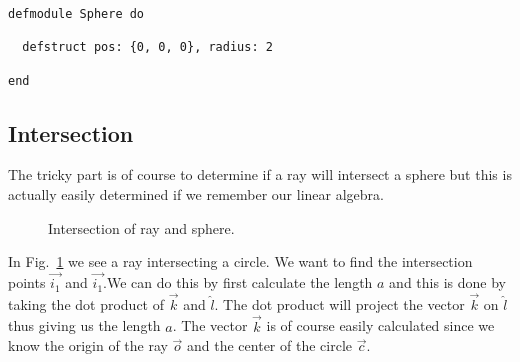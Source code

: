 \documentclass[a4paper,11pt]{article}
\begin{document}
\begin{verbatim}
defmodule Sphere do

  defstruct pos: {0, 0, 0}, radius: 2

end
\end{verbatim}


\subsection*{Intersection}

The tricky part is of course to determine if a ray will intersect a
sphere but this is actually easily determined if we remember our
linear algebra.

\begin{figure}[h!]
\begin{center}
\caption{Intersection of ray and sphere.}
\label{fig:intersection}
\end{center}
\end{figure}

In Fig.~\ref{fig:intersection} we see a ray intersecting a circle. We
want to find the intersection points $\vec{i_1}$ and $\vec{i_1}$.We
can do this by first calculate the length $a$ and this is done by taking
the dot product of $\vec{k}$ and $\hat{l}$. The dot product will
project the vector $\vec{k}$ on $\hat{l}$ thus giving us the
length $a$. The vector $\vec{k}$ is of course easily calculated since we
know the origin of the ray $\vec{o}$ and the center of the circle
$\vec{c}$.
\end{document}
